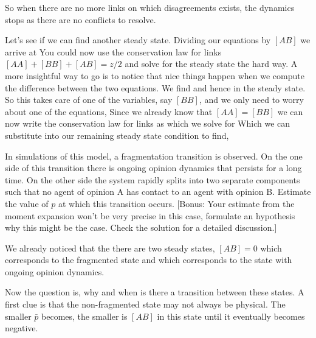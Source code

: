 So when there are no more links on which disagreements exists, the dynamics stops as there are no conflicts to resolve.

Let's see if we can find another steady state. Dividing our equations by $[AB]$ we arrive at
You could now use the conservation law for links $[AA]+[BB]+[AB]=z/2$ and solve for the steady state the hard way. A more insightful way to go is to notice that nice things happen when we compute the difference between the two equations.
We find 
and hence 
\eq{
[AA]=[BB]
}
in the steady state. So this takes care of one of the variables, say $[BB]$, and we only need to worry about one of the equations, 
Since we already know that $[AA]=[BB]$ we can now write the conservation law for links as 
which we solve for 
Which we can substitute into our remaining steady state condition to find,

\subquestion 
In simulations of this model, a fragmentation transition is observed. 
On the one side of this transition there is ongoing opinion dynamics that persists for a long time. On the other side the system rapidly splits into two separate components such that no agent of opinion A has contact to an agent with opinion B. Estimate the value of $p$ at which this transition occurs. [Bonus: Your estimate from the moment expansion won't be very precise in this case, formulate an hypothesis why this might be the case. Check the solution for a detailed discussion.]

\solution 
We already noticed that the there are two steady states, $[AB]=0$ which corresponds to the fragmented state and 
which corresponds to the state with ongoing opinion dynamics. 

Now the question is, why and when is there a transition between these states. 
A first clue is that the non-fragmented state may not always be physical. 
The smaller $\bar{p}$ becomes, the smaller is $[AB]$ in this state until it eventually becomes negative. 

